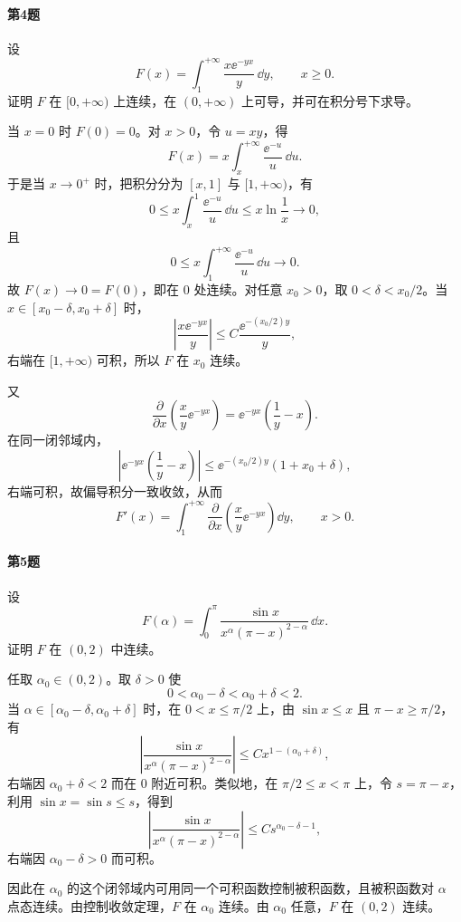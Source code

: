 \paragraph{第4题}
设
\[
F(x)=\int_1^{+\infty}\frac{x\ee^{-yx}}y\,\dd y,
\qquad x\geqslant0.
\]
证明 $F$ 在 $[0,+\infty)$ 上连续，在 $(0,+\infty)$ 上可导，并可在积分号下求导。

\begin{xsolution}
当 $x=0$ 时 $F(0)=0$。对 $x>0$，令 $u=xy$，得
\[
F(x)=x\int_x^{+\infty}\frac{\ee^{-u}}u\,\dd u.
\]
于是当 $x\to0^+$ 时，把积分分为 $[x,1]$ 与 $[1,+\infty)$，有
\[
0\leqslant x\int_x^1\frac{\ee^{-u}}u\,\dd u
\leqslant x\ln\frac1x\to0,
\]
且
\[
0\leqslant x\int_1^{+\infty}\frac{\ee^{-u}}u\,\dd u\to0.
\]
故 $F(x)\to0=F(0)$，即在 $0$ 处连续。对任意 $x_0>0$，取 $0<\delta<x_0/2$。当 $x\in[x_0-\delta,x_0+\delta]$ 时，
\[
\left|\frac{x\ee^{-yx}}y\right|
\leqslant C\frac{\ee^{-(x_0/2)y}}y,
\]
右端在 $[1,+\infty)$ 可积，所以 $F$ 在 $x_0$ 连续。

又
\[
\frac{\partial}{\partial x}\left(\frac{x}{y}\ee^{-yx}\right)
=\ee^{-yx}\left(\frac1y-x\right).
\]
在同一闭邻域内，
\[
\left|\ee^{-yx}\left(\frac1y-x\right)\right|
\leqslant \ee^{-(x_0/2)y}\left(1+x_0+\delta\right),
\]
右端可积，故偏导积分一致收敛，从而
\[
\boxed{
F'(x)=\int_1^{+\infty}
\frac{\partial}{\partial x}\left(\frac{x}{y}\ee^{-yx}\right)\dd y,
\qquad x>0.}
\]
\end{xsolution}

\paragraph{第5题}
设
\[
F(\alpha)=\int_0^\pi\frac{\sin x}{x^\alpha(\pi-x)^{2-\alpha}}\,\dd x.
\]
证明 $F$ 在 $(0,2)$ 中连续。

\begin{xsolution}
任取 $\alpha_0\in(0,2)$。取 $\delta>0$ 使
\[
0<\alpha_0-\delta<\alpha_0+\delta<2.
\]
当 $\alpha\in[\alpha_0-\delta,\alpha_0+\delta]$ 时，在 $0<x\leqslant\pi/2$ 上，由 $\sin x\leqslant x$ 且 $\pi-x\geqslant\pi/2$，有
\[
\left|\frac{\sin x}{x^\alpha(\pi-x)^{2-\alpha}}\right|
\leqslant Cx^{1-(\alpha_0+\delta)},
\]
右端因 $\alpha_0+\delta<2$ 而在 $0$ 附近可积。类似地，在 $\pi/2\leqslant x<\pi$ 上，令 $s=\pi-x$，利用 $\sin x=\sin s\leqslant s$，得到
\[
\left|\frac{\sin x}{x^\alpha(\pi-x)^{2-\alpha}}\right|
\leqslant Cs^{\alpha_0-\delta-1},
\]
右端因 $\alpha_0-\delta>0$ 而可积。

因此在 $\alpha_0$ 的这个闭邻域内可用同一个可积函数控制被积函数，且被积函数对 $\alpha$ 点态连续。由控制收敛定理，$F$ 在 $\alpha_0$ 连续。由 $\alpha_0$ 任意，$F$ 在 $(0,2)$ 连续。
\end{xsolution}

